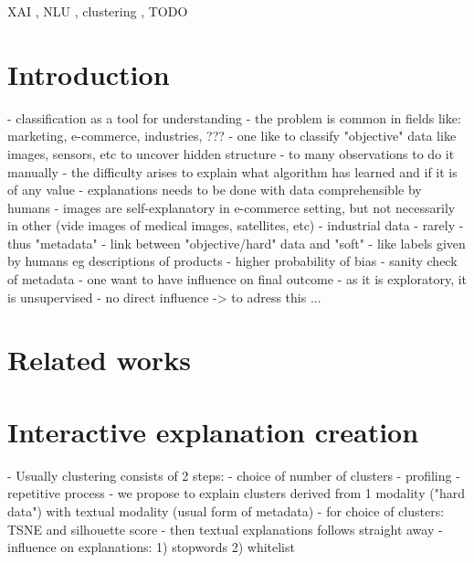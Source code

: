 \documentclass[
]{ceurart}
\begin{document}
\begin{keywords}
  XAI \sep
  NLU \sep
  clustering \sep
  TODO
\end{keywords}

\maketitle

\section{Introduction}
- classification as a tool for understanding
- the problem is common in fields like: marketing, e-commerce, industries, ???
- one like to classify "objective" data like images, sensors, etc to uncover hidden structure
   - to many observations to do it manually
- the difficulty arises to explain what algorithm has learned and if it is of any value
- explanations needs to be done with data comprehensible by humans
  - images are self-explanatory in e-commerce setting, but not necessarily in other (vide images of medical images, satellites,  etc)
  - industrial data - rarely
  - thus "metadata" - link between "objective/hard" data and "soft" - like labels given by humans eg descriptions of products
  - higher probability of bias
  - sanity check of metadata
- one want to have influence on final outcome
  - as it is exploratory, it is unsupervised
  - no direct influence -> to adress this ...

\section{Related works}

\section{Interactive explanation creation}
- Usually clustering consists of 2 steps:
  - choice of number of clusters
  - profiling
  - repetitive process
- we propose to explain clusters derived from 1 modality ("hard data") with textual modality (usual form of metadata)
  - for choice of clusters: TSNE and silhouette score
  - then textual explanations follows straight away
  - influence on explanations: 1) stopwords 2) whitelist
\end{document}
